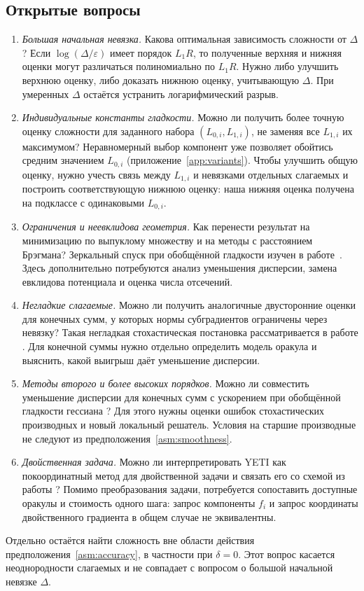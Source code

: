 \subsection{Открытые вопросы}\label{sec:open-questions}
\begin{enumerate}
\item \emph{Большая начальная невязка.}
Какова оптимальная зависимость сложности от $\Delta$?
Если $\log(\Delta/\varepsilon)$ имеет порядок $L_1R$, то полученные верхняя
и нижняя оценки могут различаться полиномиально по $L_1R$. Нужно либо
улучшить верхнюю оценку, либо доказать нижнюю оценку, учитывающую $\Delta$.
При умеренных $\Delta$ остаётся устранить логарифмический разрыв.

\item \emph{Индивидуальные константы гладкости.}
Можно ли получить более точную оценку сложности для заданного набора
$(L_{0,i},L_{1,i})$, не заменяя все $L_{1,i}$ их максимумом?
Неравномерный выбор компонент уже позволяет обойтись средним
значением $L_{0,i}$ (приложение~\ref{app:variants}). Чтобы улучшить общую
оценку, нужно учесть связь между $L_{1,i}$ и невязками отдельных слагаемых
и построить соответствующую нижнюю оценку: наша нижняя оценка получена
на подклассе с одинаковыми $L_{0,i}$.

\item \emph{Ограничения и неевклидова геометрия.}
Как перенести результат на минимизацию по выпуклому множеству
и на методы с расстоянием Брэгмана? Зеркальный спуск при обобщённой
гладкости изучен в работе~\citet{yu2026mirror}. Здесь дополнительно
потребуются анализ уменьшения дисперсии, замена евклидова потенциала
и оценка числа отсечений.

\item \emph{Негладкие слагаемые.}
Можно ли получить аналогичные двусторонние оценки для конечных сумм,
у которых нормы субградиентов ограничены через невязку?
Такая негладкая стохастическая постановка рассматривается в работе
\citet{kovalev2026nonsmooth}. Для конечной суммы нужно отдельно определить
модель оракула и выяснить, какой выигрыш даёт уменьшение дисперсии.

\item \emph{Методы второго и более высоких порядков.}
Можно ли совместить уменьшение дисперсии для конечных сумм
\citep{tsedenov2026second} с ускорением при обобщённой гладкости
гессиана \citep{agafonov2026inexact}? Для этого нужны оценки ошибок
стохастических производных и новый локальный решатель. Условия на старшие
производные не следуют из предположения~\ref{asm:smoothness}.

\item \emph{Двойственная задача.}
Можно ли интерпретировать YETI как покоординатный метод для двойственной
задачи и связать его со схемой из работы \citet{podlipnova2026sparse}?
Помимо преобразования задачи, потребуется сопоставить доступные оракулы
и стоимость одного шага: запрос компоненты $f_i$ и запрос координаты
двойственного градиента в общем случае не эквивалентны.
\end{enumerate}

Отдельно остаётся найти сложность вне области действия
предположения~\ref{asm:accuracy}, в частности при $\delta=0$.
Этот вопрос касается неоднородности слагаемых и не совпадает
с вопросом о большой начальной невязке $\Delta$.

